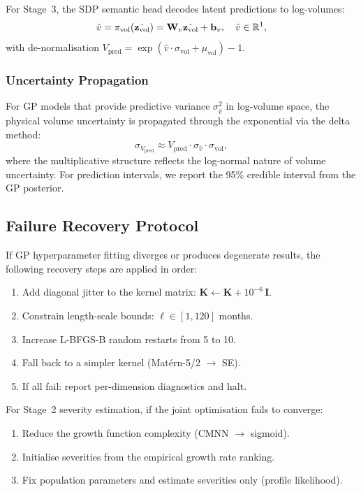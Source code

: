 For Stage~3, the SDP semantic head decodes latent predictions to
log-volumes:
\begin{equation}
  \hat{v} = \pi_{\text{vol}}(\hat{\mathbf{z}_{\text{vol}}})
    = \mathbf{W}_v \hat{\mathbf{z}_{\text{vol}}} + \mathbf{b}_v,
  \quad \hat{v} \in \mathbb{R}^1,
  \label{eq:vol_decode}
\end{equation}
with de-normalisation $V_{\text{pred}} = \exp(\hat{v} \cdot \sigma_{\text{vol}}
+ \mu_{\text{vol}}) - 1$.

\subsubsection{Uncertainty Propagation}

For GP models that provide predictive variance $\sigma^2_{\hat{v}}$ in
log-volume space, the physical volume uncertainty is propagated through the
exponential via the delta method:
\begin{equation}
  \sigma_{V_{\text{pred}}} \approx V_{\text{pred}} \cdot \sigma_{\hat{v}}
    \cdot \sigma_{\text{vol}},
  \label{eq:delta_method}
\end{equation}
where the multiplicative structure reflects the log-normal nature of volume
uncertainty. For prediction intervals, we report the 95\% credible interval
from the GP posterior.

\subsection{Failure Recovery Protocol}
\label{sec:growth:failure}

If GP hyperparameter fitting diverges or produces degenerate results, the
following recovery steps are applied in order:
\begin{enumerate}[leftmargin=*]
  \item Add diagonal jitter to the kernel matrix:
    $\mathbf{K} \leftarrow \mathbf{K} + 10^{-6}\,\mathbf{I}$.
  \item Constrain length-scale bounds: $\ell \in [1, 120]$ months.
  \item Increase L-BFGS-B random restarts from 5 to 10.
  \item Fall back to a simpler kernel (Mat\'{e}rn-5/2 $\to$ SE).
  \item If all fail: report per-dimension diagnostics and halt.
\end{enumerate}

For Stage~2 severity estimation, if the joint optimisation fails to converge:
\begin{enumerate}[leftmargin=*]
  \item Reduce the growth function complexity (CMNN $\to$ sigmoid).
  \item Initialise severities from the empirical growth rate ranking.
  \item Fix population parameters and estimate severities only (profile
    likelihood).
\end{enumerate}
